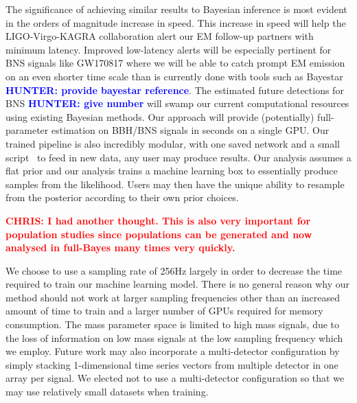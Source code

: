 \documentclass[%
showpacs,
 amsmath,amssymb,
 aps,
 twocolumn,
 prl,
 reprint,
floatfix,
]{revtex4-1}
\newcommand{\chris}[1]{\textbf{\textcolor{red}{CHRIS: #1}}}
\newcommand{\hunter}[1]{\textbf{\textcolor{blue}{HUNTER: #1}}}
\begin{document}
%
%
The significance of achieving similar results
to Bayesian inference is most evident in the orders of magnitude increase in speed. This increase in speed will help the
LIGO-Virgo-KAGRA collaboration alert our \ac{EM} follow-up partners with
minimum latency. Improved low-latency alerts will be especially 
pertinent for \ac{BNS} signals like GW170817 where we will be able 
to catch prompt \ac{EM} emission on an even shorter time scale than 
is currently done with tools such as Bayestar \hunter{provide bayestar 
reference}. The estimated future detections for \ac{BNS} \hunter{ 
give number} will swamp our current computational resources using 
existing Bayesian methods. Our approach will provide (potentially) 
full-parameter estimation on \ac{BBH}/{\ac{BNS}} signals in seconds 
on a single GPU. Our trained pipeline is also incredibly modular, with 
one saved network and a small script~ to feed in new data, 
any user may produce results. Our analysis assumes a flat prior and our 
analysis trains a machine learning box to essentially produce samples 
from the likelihood. Users may then have the unique ability to 
resample from the posterior according to their own prior choices.  

\chris{I had another thought. This is also very important for population
studies since populations can be generated and now analysed in full-Bayes many
times very quickly.}

%
%
We choose to use a sampling rate of 256Hz largely in order to 
decrease the time required to train our machine learning model. 
There is no general reason why our method 
should not work at larger sampling frequencies other than an 
increased amount of time to train and a larger 
number of GPUs required for memory consumption. The mass parameter space is limited 
to high mass signals, due to the loss of information on low mass 
signals at the low sampling frequency which we employ. Future work 
may also incorporate a multi-detector configuration by simply stacking 
1-dimensional time series vectors from multiple detector in one array 
per signal. We elected not to use a multi-detector configuration so 
that we may use relatively small datasets when training.
\end{document}
